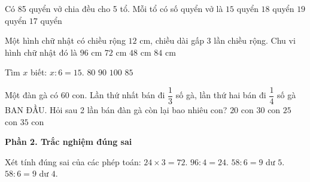\begin{ex} %
Có 85 quyển vở chia đều cho 5 tổ. Mỗi tổ có số quyển vở là
\choice
{$15$ quyển}
{$18$ quyển}
{$19$ quyển}
{\True $17$ quyển}
\end{ex}

\begin{ex} %
Một hình chữ nhật có chiều rộng $12\text{ cm}$, chiều dài gấp 3 lần chiều rộng. Chu vi hình chữ nhật đó là
\choice
{\True $96\text{ cm}$}
{$72\text{ cm}$}
{$48\text{ cm}$}
{$84\text{ cm}$}
\end{ex}

\begin{ex} %
Tìm $x$ biết: $x : 6 = 15$.
\choice
{$80$}
{\True $90$}
{$100$}
{$85$}
\end{ex}

\begin{ex} %
Một đàn gà có 60 con. Lần thứ nhất bán đi $\dfrac{1}{3}$ số gà, lần thứ hai bán đi $\dfrac{1}{4}$ số gà BAN ĐẦU. Hỏi sau 2 lần bán đàn gà còn lại bao nhiêu con?
\choice
{$20$ con}
{$30$ con}
{\True $25$ con}
{$35$ con}
\end{ex}

\textbf{Phần 2. Trắc nghiệm đúng sai}

\begin{ex} %
Xét tính đúng sai của các phép toán:
\choiceTF
{\True $24 \times 3 = 72$.}
{\True $96 : 4 = 24$.}
{$58 : 6 = 9$ dư $5$.}
{\True $58 : 6 = 9$ dư $4$.}
\end{ex}

